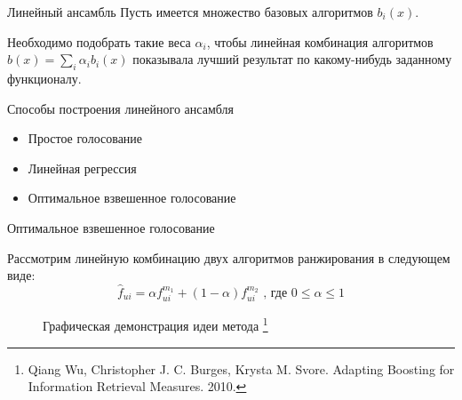 \documentclass[10pt,pdf,hyperref={unicode}]{beamer}
\begin{document}
\begin{frame}{Линейный ансамбль}
Пусть имеется множество базовых алгоритмов $b_i(x)$. 

\bigbreak

Необходимо подобрать такие веса $\alpha_i$, чтобы линейная комбинация алгоритмов $\hat{b}(x) = \sum_i \alpha_i b_i(x)$ показывала лучший результат по какому-нибудь заданному функционалу. 
\end{frame}

\begin{frame}{Способы построения линейного ансамбля}

\begin{itemize}
\item Простое голосование

\item Линейная регрессия

\item Оптимальное взвешенное голосование
\end{itemize}

\end{frame}

\begin{frame}{Оптимальное взвешенное голосование}

 Рассмотрим линейную комбинацию двух алгоритмов ранжирования  в следующем виде:
\begin{equation*}
	\hat{f}_{ui} = \alpha f_{ui}^{m_1} + (1 - \alpha) f_{ui} ^ {m_2} \textrm{\ , где $0 \leq \alpha \leq 1$}
\end{equation*} 
	
\begin{figure}[h]
\caption{Графическая демонстрация идеи метода \footnote{Qiang Wu, Christopher J. C. Burges, Krysta M. Svore.	 Adapting Boosting for Information Retrieval Measures. 2010.}}
\label{pic:latexpic}
\end{figure}

\end{frame}
\end{document}

